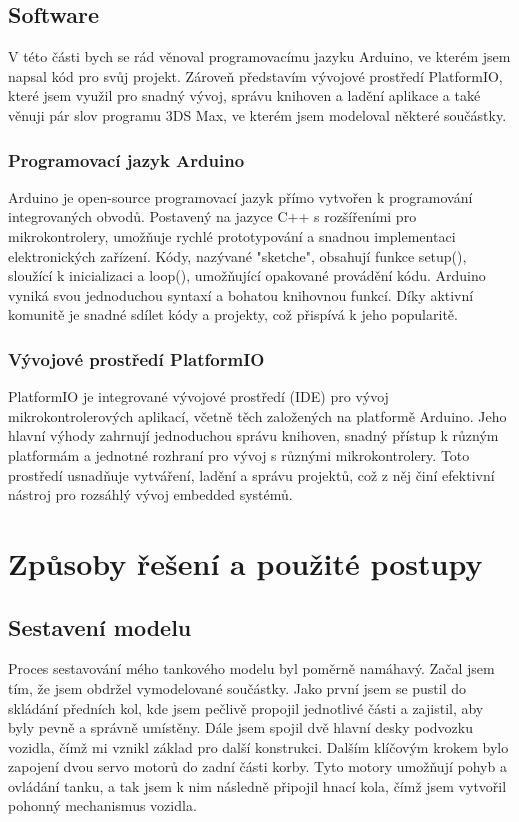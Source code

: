 \documentclass[12pt, a4paper,
oneside
openany
]{report}
\begin{document}
\newpage
\section{Software}
\label{sec:prace_s_textem}

V této části bych se rád věnoval programovacímu jazyku Arduino, ve kterém jsem napsal kód pro svůj projekt. Zároveň představím vývojové prostředí PlatformIO, které jsem využil pro snadný vývoj, správu knihoven a ladění aplikace a také věnuji pár slov programu 3DS Max, ve kterém jsem modeloval některé součástky.

\subsection{Programovací jazyk Arduino}
\noindent Arduino je open-source programovací jazyk přímo vytvořen k programování integrovaných obvodů. Postavený na jazyce C++ s rozšířeními pro mikrokontrolery, umožňuje rychlé prototypování a snadnou implementaci elektronických zařízení. Kódy, nazývané "sketche", obsahují funkce setup(), sloužící k inicializaci a loop(), umožňující opakované provádění kódu. Arduino vyniká svou jednoduchou syntaxí a bohatou knihovnou funkcí. Díky aktivní komunitě je snadné sdílet kódy a projekty, což přispívá k jeho popularitě.


\subsection{Vývojové prostředí PlatformIO}
\noindent PlatformIO je integrované vývojové prostředí (IDE) pro vývoj mikrokontrolerových aplikací, včetně těch založených na platformě Arduino. Jeho hlavní výhody zahrnují jednoduchou správu knihoven, snadný přístup k různým platformám a jednotné rozhraní pro vývoj s různými mikrokontrolery. Toto prostředí usnadňuje vytváření, ladění a správu projektů, což z něj činí efektivní nástroj pro rozsáhlý vývoj embedded systémů.




\chapter{Způsoby řešení a použité postupy}
	
\section{Sestavení modelu} 
\noindent Proces sestavování mého tankového modelu byl poměrně namáhavý. Začal jsem tím, že jsem obdržel vymodelované součástky. Jako první jsem se pustil do skládání předních kol, kde jsem pečlivě propojil jednotlivé části a zajistil, aby byly pevně a správně umístěny. Dále jsem spojil dvě hlavní desky podvozku vozidla, čímž mi vznikl základ pro další konstrukci.
Dalším klíčovým krokem bylo zapojení dvou servo motorů do zadní části korby. Tyto motory umožňují  pohyb a ovládání tanku, a tak jsem k nim následně připojil hnací kola, čímž jsem vytvořil pohonný mechanismus vozidla.
\end{document}
